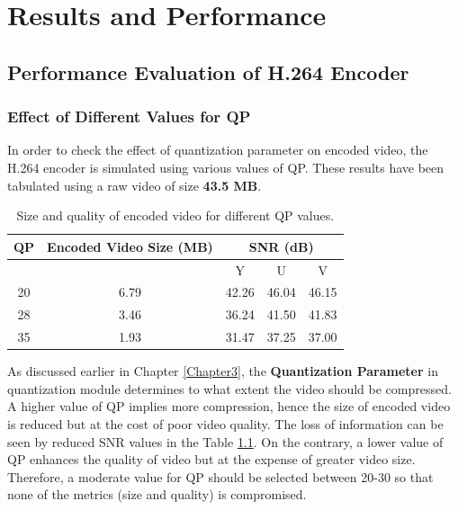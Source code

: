 
\chapter{Results and Performance} %
\label{Chapter5}


\section{Performance Evaluation of H.264 Encoder}

\subsection{Effect of Different Values for QP}
In order to check the effect of quantization parameter on encoded video, the H.264 encoder is simulated using various values of QP. These results have been tabulated using a raw video of size \textbf{43.5 MB}.
\begin{table}[H]
	\centering
	\begin{tabular}{|c|c|c|c|c|} \hline
		QP  & Encoded Video Size (MB) & \multicolumn{3}{|c|}{SNR (dB)}  \\ \hline
		    &                    &  Y & U & V \\ \hline
		20  &    6.79            & 42.26   & 46.04  & 46.15  \\ \hline
		28  &    3.46            & 36.24   & 41.50  & 41.83  \\ \hline
		35  &    1.93            & 31.47   & 37.25  & 37.00  \\ \hline
	\end{tabular}
	\caption{Size and quality of encoded video for different QP values.}
	\label{tab:qp}
\end{table}
As discussed earlier in Chapter \ref{Chapter3}, the \textbf{Quantization Parameter} in quantization module determines to what extent the video should be compressed. A higher value of QP implies more compression, hence the size of encoded video is reduced but at the cost of poor video quality. The loss of information can be seen by reduced SNR values in the Table \ref{tab:qp}. On the contrary, a lower value of QP enhances the quality of video but at the expense of greater video size. Therefore, a moderate value for QP should be selected between 20-30 so that none of the metrics (size and quality) is compromised. 


